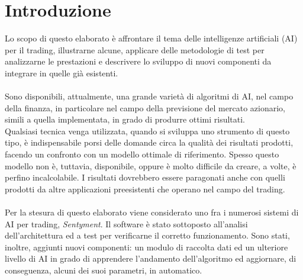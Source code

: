\documentclass[a4paper,12pt]{report}
\begin{document}
\section{Introduzione}
Lo scopo di questo elaborato è affrontare il tema delle intelligenze artificiali (AI) per il trading, illustrarne alcune, applicare delle metodologie di test per analizzarne le prestazioni e descrivere lo sviluppo di nuovi componenti da integrare in quelle già esistenti.
\\~\\
Sono disponibili, attualmente, una grande varietà di algoritmi di AI, nel campo della finanza, in particolare nel campo della previsione del mercato azionario, simili a quella implementata, in grado di produrre ottimi risultati.\\Qualsiasi tecnica venga utilizzata, quando si sviluppa uno strumento di questo tipo, è indispensabile porsi delle domande circa la qualità dei risultati prodotti, facendo un confronto con un modello ottimale di riferimento. Spesso questo modello non è, tuttavia, disponibile, oppure è molto difficile da creare, a volte, è perfino incalcolabile. I risultati dovrebbero essere paragonati anche con quelli prodotti da altre applicazioni preesistenti che operano nel campo del trading.\\~\\
Per la stesura di questo elaborato viene considerato uno fra i numerosi sistemi di AI per trading, \textit{Sentyment}. Il software è stato sottoposto all'analisi dell'architettura ed a test per verificarne il corretto funzionamento. Sono stati, inoltre, aggiunti nuovi componenti: un modulo di raccolta dati ed un ulteriore livello di AI in grado di apprendere l'andamento dell'algoritmo ed aggiornare, di conseguenza, alcuni dei suoi parametri, in automatico.
\end{document}
